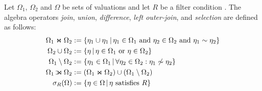 Let $\Omega_1$, $\Omega_2$ and $\Omega$ be sets of
	valuations and let
$R$ be a filter condition%
	.
The algebra operators \emph{join}, \emph{union}, \emph{difference}, \emph{left outer-join},
	and \emph{selection}
are defined as follows:
\begin{align*}
	\Omega_1 \Join \Omega_2 & := \lbrace \eta_1 \cup \eta_1 \,|\, \eta_1 \in \Omega_1 \text{ and } \eta_2 \in \Omega_2 \text{ and } \eta_1 \sim \eta_2 \rbrace
	\\
	\Omega_2 \cup \Omega_2 & := \lbrace \eta \,|\, \eta \in \Omega_1 \text{ or } \eta \in \Omega_2 \rbrace
	\\
	\Omega_1 \setminus \Omega_2 & := \lbrace \eta_1 \in \Omega_1 \,|\, \forall \eta_2 \in \Omega_2 : \eta_1 \not\sim \eta_2 \rbrace
	\\
	\Omega_1 \LJoin \Omega_2 &:= \left( \Omega_1 \Join \Omega_2 \right) \cup \left( \Omega_1 \setminus \Omega_2 \right)
	\\
	\sigma_R ( \Omega ) &:= \lbrace \eta \in \Omega \,|\, \eta \text{ satisfies } R \rbrace
\end{align*}

